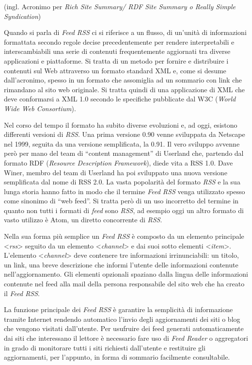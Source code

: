 \documentclass[
  b5paper,
  twoside,
  11pt,
  chapterprefix=false,
  bibliography=totocnumbered,
  parskip=0]{scrbook}
\begin{document}
(ingl. Acronimo per \emph{Rich Site Summary/ RDF Site Summary o Really Simple
Syndication})

Quando si parla di \emph{Feed RSS} ci si riferisce a un flusso, di un'unità
di informazioni formattata secondo regole decise precedentemente per
rendere interpretabili e interscambiabili una serie di contenuti
frequentemente aggiornati tra diverse applicazioni e piattaforme. Si
tratta di un metodo per fornire e distribuire i contenuti sul Web
attraverso un formato standard XML e, come si desume dall'acronimo,
spesso in un formato che assomiglia ad un sommario con link che
rimandano al sito web originale. Si tratta quindi di una applicazione di
XML che deve conformarsi a XML 1.0 secondo le specifiche pubblicate dal
W3C (\emph{World Wide Web Consortium}).

Nel corso del tempo il formato ha subito diverse evoluzioni e, ad oggi,
esistono differenti versioni di \emph{RSS}. Una prima versione 0.90 venne
sviluppata da Netscape nel 1999, seguita da una versione semplificata,
la 0.91. Il vero sviluppo avvenne però per mano del team di \enquote{content
management} di Userland che, partendo dal formato RDF (\emph{Resource
Description Framework}), diede vita a RSS 1.0. Dave Winer, membro del
team di Userland ha poi sviluppato una nuova versione semplificata dal
nome di RSS 2.0. La vasta popolarità del formato \emph{RSS} e la sua lunga
storia hanno fatto in modo che il termine \emph{Feed RSS} venga utilizzato
spesso come sinonimo di \enquote{web feed}. Si tratta però di un uso incorretto
del termine in quanto non tutti i formati di \emph{feed} sono \emph{RSS}, ad
esempio oggi un altro formato di vasto utilizzo è Atom, un diretto
concorrente di \emph{RSS}.

Nella sua forma più semplice un \emph{Feed RSS} è composto da un elemento
principale \textless{}\emph{rss}\textgreater{} seguito da un elemento \textless{}\emph{channel}\textgreater{} e dai suoi
sotto elementi \textless{}\emph{item}\textgreater. L'elemento \textless{}\emph{channel}\textgreater{} deve contenere tre
informazioni irrinunciabili: un titolo, un link, una breve descrizione
che informi l'utente delle informazioni contenute nell'aggiornamento.
Gli elementi opzionali spaziano dalla lingua delle informazioni
contenute nel feed alla mail della persona responsabile del sito web che
ha creato il \emph{Feed RSS}.

La funzione principale dei \emph{Feed RSS} è garantire la semplicità di
informazione tramite Internet rendendo automatico l'invio degli
aggiornamenti dei siti o blog che vengono visitati dall'utente. Per
usufruire dei feed generati automaticamente dai siti che interessano il
lettore è necessario fare uso di \emph{Feed Reader} o aggregatori in grado di
monitorare tutti i siti richiesti dall'utente e restituire gli
aggiornamenti, per l'appunto, in forma di sommario facilmente
consultabile.
\end{document}
